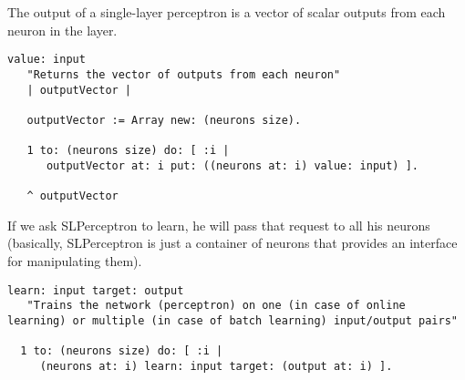The output of a single-layer perceptron is a vector of scalar outputs from each neuron in the layer.

\begin{lstlisting}
value: input
   "Returns the vector of outputs from each neuron"
   | outputVector |
 
   outputVector := Array new: (neurons size).
 
   1 to: (neurons size) do: [ :i |
      outputVector at: i put: ((neurons at: i) value: input) ].
 
   ^ outputVector
\end{lstlisting}

If we ask SLPerceptron to learn, he will pass that request to all his neurons (basically, SLPerceptron is just a container of neurons that provides an interface for manipulating them).

\begin{lstlisting}
learn: input target: output
   "Trains the network (perceptron) on one (in case of online learning) or multiple (in case of batch learning) input/output pairs"

  1 to: (neurons size) do: [ :i |
     (neurons at: i) learn: input target: (output at: i) ].
\end{lstlisting}
